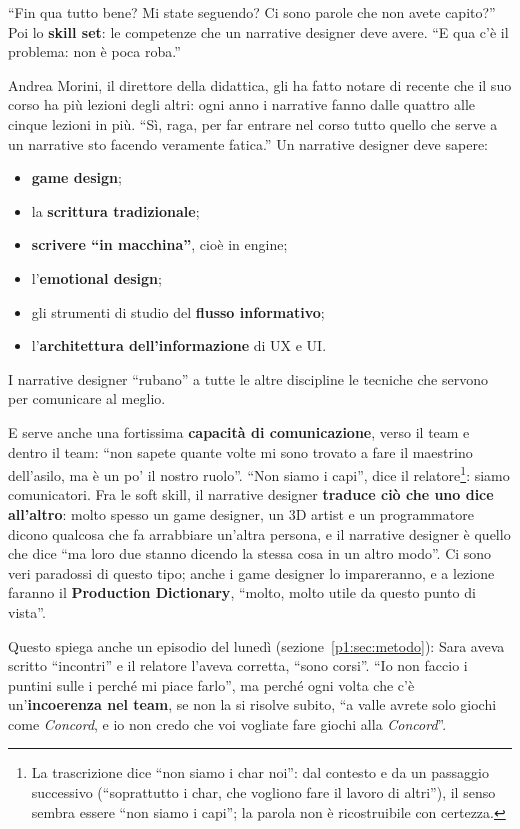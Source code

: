 ``Fin qua tutto bene? Mi state seguendo? Ci sono parole che non avete
capito?'' Poi lo \textbf{skill set}: le competenze che un narrative designer
deve avere. ``E qua c'è il problema: non è poca roba.''

Andrea Morini, il direttore della didattica, gli ha fatto notare di recente
che il suo corso ha più lezioni degli altri: ogni anno i narrative fanno
dalle quattro alle cinque lezioni in più. ``Sì, raga, per far entrare nel
corso tutto quello che serve a un narrative sto facendo veramente fatica.''
Un narrative designer deve sapere:
\begin{itemize}
  \item \textbf{game design};
  \item la \textbf{scrittura tradizionale};
  \item \textbf{scrivere ``in macchina''}, cioè in engine;
  \item l'\textbf{emotional design};
  \item gli strumenti di studio del \textbf{flusso informativo};
  \item l'\textbf{architettura dell'informazione} di UX e UI.
\end{itemize}
I narrative designer ``rubano'' a tutte le altre discipline le tecniche che
servono per comunicare al meglio.

E serve anche una fortissima \textbf{capacità di comunicazione}, verso il team
e dentro il team: ``non sapete quante volte mi sono trovato a fare il maestrino
dell'asilo, ma è un po' il nostro ruolo''. ``Non siamo i capi'', dice il
relatore\footnote{La trascrizione dice ``non siamo i char noi'': dal contesto
e da un passaggio successivo (``soprattutto i char, che vogliono fare il
lavoro di altri''), il senso sembra essere ``non siamo i capi''; la parola non
è ricostruibile con certezza.}: siamo comunicatori. Fra le soft skill,
il narrative designer \textbf{traduce ciò che uno dice all'altro}: molto
spesso un game designer, un 3D artist e un programmatore dicono qualcosa che
fa arrabbiare un'altra persona, e il narrative designer è quello che dice
``ma loro due stanno dicendo la stessa cosa in un altro modo''. Ci sono veri
paradossi di questo tipo; anche i game designer lo impareranno, e a lezione
faranno il \textbf{Production Dictionary}, ``molto, molto utile da questo
punto di vista''.

Questo spiega anche un episodio del lunedì (sezione~\ref{p1:sec:metodo}):
Sara aveva scritto ``incontri'' e il relatore l'aveva corretta, ``sono
corsi''. ``Io non faccio i puntini sulle i perché mi piace farlo'', ma perché
ogni volta che c'è un'\textbf{incoerenza nel team}, se non la si risolve
subito, ``a valle avrete solo giochi come \emph{Concord}, e io non credo che
voi vogliate fare giochi alla \emph{Concord}''.

